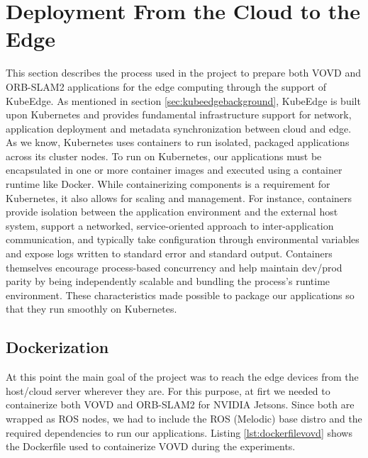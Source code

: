 \section{Deployment From the Cloud to the Edge}
This section describes the process used in the project to prepare both VOVD and ORB-SLAM2 applications for the edge computing through the support of KubeEdge.
As mentioned in section \ref{sec:kubeedgebackground}, KubeEdge is built upon Kubernetes and provides fundamental infrastructure support for network, application deployment and metadata synchronization between cloud and edge. As we know, Kubernetes uses containers to run isolated, packaged applications across its cluster nodes. To run on Kubernetes, our applications must be encapsulated in one or more container images and executed using a container runtime like Docker. While containerizing components is a requirement for Kubernetes, it also allows for scaling and management. For instance, containers provide isolation between the application environment and the external host system, support a networked, service-oriented approach to inter-application communication, and typically take configuration through environmental variables and expose logs written to standard error and standard output. Containers themselves encourage process-based concurrency and help maintain dev/prod parity by being independently scalable and bundling the process's runtime environment. These characteristics made possible to package our applications so that they run smoothly on Kubernetes.


\subsection{Dockerization}
At this point the main goal of the project was to reach the edge devices from the host/cloud server wherever they are.
For this purpose, at firt we needed to containerize both VOVD and ORB-SLAM2 for NVIDIA Jetsons.
Since both are wrapped as ROS nodes, we had to include the ROS (Melodic) base distro and the required dependencies to run our applications.
Listing \ref{lst:dockerfilevovd} shows the Dockerfile used to containerize VOVD during the experiments.

